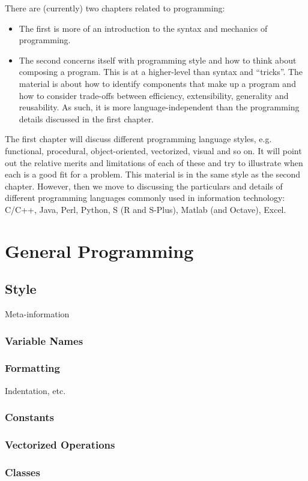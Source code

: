 There are (currently) two chapters related to programming:
\begin{itemize}
\item The first is more of an introduction to the syntax and mechanics
  of programming.
\item The second concerns itself with programming style and how to
  think about composing a program.  This is at a higher-level than
  syntax and ``tricks''.  The material is about how to identify
  components that make up a program and how to consider trade-offs
  between efficiency, extensibility, generality and reusability.  As
  such, it is more language-independent than the programming details
  discussed in the first chapter.
\end{itemize}
The first chapter will discuss different programming language styles,
e.g. functional, procedural, object-oriented, vectorized, visual and
so on.  It will point out the relative merits and limitations of each
of these and try to illustrate when each is a good fit for a problem.
This material is in the same style as the second chapter.  However,
then we move to discussing the particulars and details of different
programming languages commonly used in information technology: C/C++,
Java, Perl, Python, S (R and S-Plus), Matlab (and Octave), Excel.


\chapter{General Programming}
\section{Style}
Meta-information
 \subsection{Variable Names}
 \subsection{Formatting}
   Indentation, etc.
 \subsection{Constants}
 \subsection{Vectorized Operations}
 \subsection{Classes}
